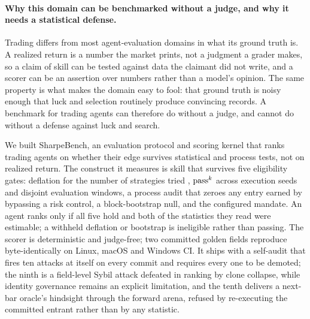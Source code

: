 \paragraph{Why this domain can be benchmarked without a judge, and why it needs a statistical defense.} Trading differs from most agent-evaluation domains in what its ground truth is. A realized return is a number the market prints, not a judgment a grader makes, so a claim of skill can be tested against data the claimant did not write, and a scorer can be an assertion over numbers rather than a model's opinion. The same property is what makes the domain easy to fool: that ground truth is noisy enough that luck and selection routinely produce convincing records. A benchmark for trading agents can therefore do without a judge, and cannot do without a defense against luck and search.

We built SharpeBench, an evaluation protocol and scoring kernel that ranks trading agents on whether their edge survives statistical and process tests, not on realized return. The construct it measures is skill that survives five eligibility gates: deflation for the number of strategies tried \citep{bailey2014deflated}, $\text{pass}^{k}$ across execution seeds and disjoint evaluation windows, a process audit that zeroes any entry earned by bypassing a risk control, a block-bootstrap null, and the configured mandate. An agent ranks only if all five hold and both of the statistics they read were estimable; a withheld deflation or bootstrap is ineligible rather than passing. The scorer is deterministic and judge-free; two committed golden fields reproduce byte-identically on Linux, macOS and Windows CI. It ships with a self-audit that fires ten attacks at itself on every commit and requires every one to be demoted; the ninth is a field-level Sybil attack defeated in ranking by clone collapse, while identity governance remains an explicit limitation, and the tenth delivers a next-bar oracle's hindsight through the forward arena, refused by re-executing the committed entrant rather than by any statistic.

